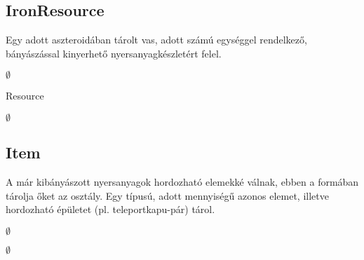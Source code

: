 \subsection{IronResource}
\begin{class-template-responsibility}
Egy adott aszteroidában tárolt vas, adott számú egységgel rendelkező, bányászással kinyerhető nyersanyagkészletért felel. 
\end{class-template-responsibility}
\begin{class-template-interface}
$\emptyset$
\end{class-template-interface}
\begin{class-template-baseclass}
Resource
\end{class-template-baseclass}
\begin{class-template-attribute}
\item[] $\emptyset$
\end{class-template-attribute}
\begin{class-template-method}
\end{class-template-method}


\subsection{Item}
\begin{class-template-responsibility}
A már kibányászott nyersanyagok hordozható elemekké válnak, ebben a formában tárolja őket az osztály. Egy típusú, adott mennyiségű azonos elemet, illetve hordozható épületet (pl. teleportkapu-pár) tárol.
\end{class-template-responsibility}
\begin{class-template-interface}
$\emptyset$
\end{class-template-interface}
\begin{class-template-baseclass}
$\emptyset$
\end{class-template-baseclass}
\begin{class-template-attribute}
\end{class-template-attribute}
\begin{class-template-method}
\end{class-template-method}


